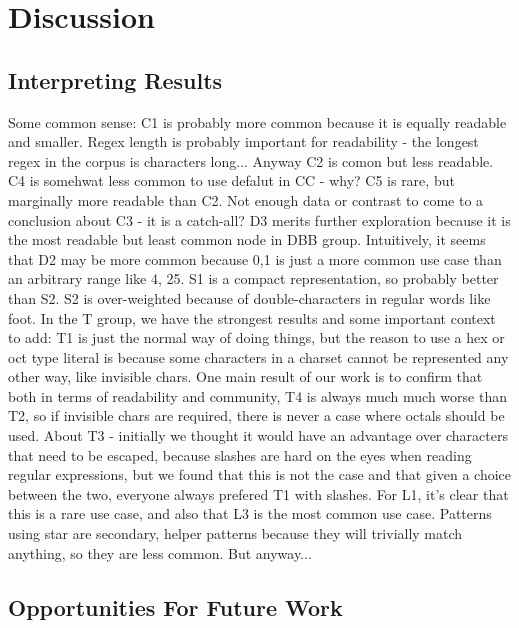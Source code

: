 \section{Discussion}
\label{sec:discussion}
\subsection{Interpreting Results}
Some common sense: C1 is probably more common because it is equally readable and smaller.  Regex length is probably important for readability - the longest regex in the corpus is  characters long...  Anyway C2 is comon but less readable.  C4 is somehwat less common to use defalut in CC - why?  C5 is rare, but marginally more readable than C2.  Not enough data or contrast to come to a conclusion about C3 - it is a catch-all?  D3 merits further exploration because it is the most readable but least common node in DBB group.  Intuitively, it seems that D2 may be more common because 0,1 is just a more common use case than an arbitrary range like 4, 25.  S1 is a compact representation, so probably better than S2.  S2 is over-weighted because of double-characters in regular words like foot.  In the T group, we have the strongest results and some important context to add: T1 is just the normal way of doing things, but the reason to use a hex or oct type literal is because some characters in a charset cannot be represented any other way, like invisible chars.  One main result of our work is to confirm that both in terms of readability and community, T4 is always much much worse than T2, so if invisible chars are required, there is never a case where octals should be used.  About T3 - initially we thought it would have an advantage over characters that need to be escaped, because slashes are hard on the eyes when reading regular expressions, but we found that this is not the case and that given a choice between the two, everyone always prefered T1 with slashes.  For L1, it's clear that this is a rare use case, and also that L3 is the most common  use case.  Patterns using star are secondary, helper patterns because they will trivially match anything, so they are less common.  But anyway...

\subsection{Opportunities For Future Work}
